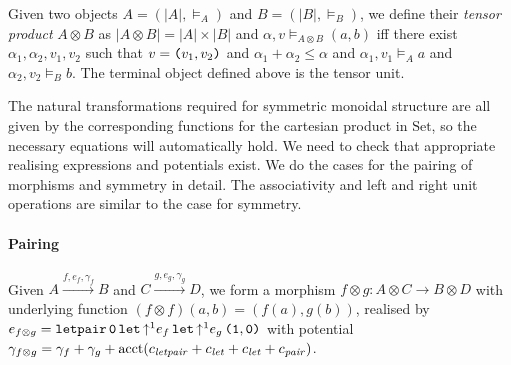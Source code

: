 \documentclass{workingnote}
\newcommand{\Set}{\mathrm{Set}}
\newcommand{\account}{\mathrm{acct}}
\begin{document}
Given two objects $A = (|A|, \models_A)$ and $B = (|B|, \models_B)$,
we define their \emph{tensor product} $A \otimes B$ as
$|A \otimes B| = |A| \times |B|$ and
$\alpha, v \models_{A\otimes B} (a,b)$ iff there exist
$\alpha_1, \alpha_2, v_1, v_2$ such that $v = \texttt{(}v_1, v_2\texttt{)}$ and
$\alpha_1 + \alpha_2 \leq \alpha$ and $\alpha_1, v_1 \models_A a$ and
$\alpha_2, v_2 \models_B b$. The terminal object defined above is the
tensor unit.

The natural transformations required for symmetric monoidal structure
are all given by the corresponding functions for the cartesian product
in $\Set$, so the necessary equations will automatically hold. We need
to check that appropriate realising expressions and potentials
exist. We do the cases for the pairing of morphisms and symmetry in
detail. The associativity and left and right unit operations are
similar to the case for symmetry.

\paragraph{Pairing}

Given $A \stackrel{f,e_f,\gamma_f}\longrightarrow B$ and
$C \stackrel{g,e_g,\gamma_g}\longrightarrow D$, we form a morphism
$f \otimes g : A \otimes C \to B \otimes D$ with underlying function
$(f \otimes f)(a,b) = (f(a),g(b))$, realised by
$e_{f \otimes g} = \texttt{letpair}\,\texttt{0}\,\texttt{let}\,\mathord\uparrow^1
e_f\,\texttt{let}\,\mathord\uparrow^1 e_g\,\texttt{(}\texttt{1},\texttt{0}\texttt{)}$ with
potential
$\gamma_{f \otimes g} = \gamma_f + \gamma_g + \account(\cnstLetPair +
\cnstLet + \cnstLet + \cnstPair)$.
\end{document}

